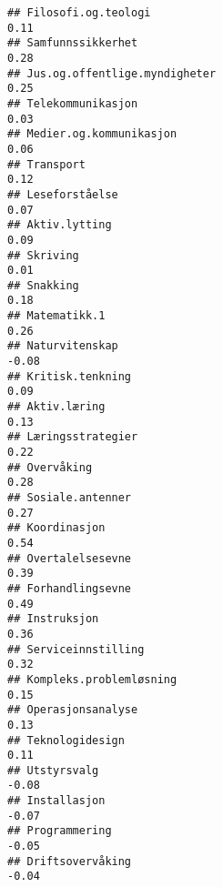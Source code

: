 \documentclass[
]{article}
\begin{document}
\begin{verbatim}
## Filosofi.og.teologi                                                               0.11
## Samfunnssikkerhet                                                                 0.28
## Jus.og.offentlige.myndigheter                                                     0.25
## Telekommunikasjon                                                                 0.03
## Medier.og.kommunikasjon                                                           0.06
## Transport                                                                         0.12
## Leseforståelse                                                                    0.07
## Aktiv.lytting                                                                     0.09
## Skriving                                                                          0.01
## Snakking                                                                          0.18
## Matematikk.1                                                                      0.26
## Naturvitenskap                                                                   -0.08
## Kritisk.tenkning                                                                  0.09
## Aktiv.læring                                                                      0.13
## Læringsstrategier                                                                 0.22
## Overvåking                                                                        0.28
## Sosiale.antenner                                                                  0.27
## Koordinasjon                                                                      0.54
## Overtalelsesevne                                                                  0.39
## Forhandlingsevne                                                                  0.49
## Instruksjon                                                                       0.36
## Serviceinnstilling                                                                0.32
## Kompleks.problemløsning                                                           0.15
## Operasjonsanalyse                                                                 0.13
## Teknologidesign                                                                   0.11
## Utstyrsvalg                                                                      -0.08
## Installasjon                                                                     -0.07
## Programmering                                                                    -0.05
## Driftsovervåking                                                                 -0.04

\end{verbatim}
\end{document}
